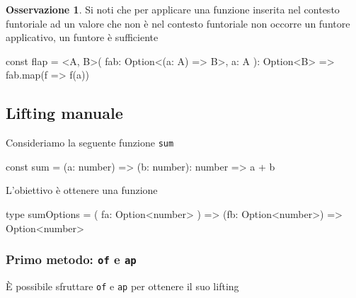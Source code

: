 \documentclass[12pt]{article}
\theoremstyle{definition}
\newtheorem{observation}{Osservazione}[section]
\newenvironment{code}
  {\vspace{0.5cm} \VerbatimEnvironment\begin{typescriptcode}}
  {\end{typescriptcode} \vspace{0.2cm}}
\begin{document}






\begin{observation}
Si noti che per applicare una funzione inserita nel contesto funtoriale ad un valore
che non è nel contesto funtoriale non occorre un funtore applicativo, un funtore è sufficiente
\end{observation}

\begin{code}
const flap = <A, B>(
  fab: Option<(a: A) => B>,
  a: A
): Option<B> => fab.map(f => f(a))
\end{code}

\subsection{Lifting manuale}

Consideriamo la seguente funzione \texttt{sum}

\begin{code}
const sum = (a: number) => (b: number): number => a + b
\end{code}

L'obiettivo è ottenere una funzione

\begin{code}
type sumOptions = (
  fa: Option<number>
) => (fb: Option<number>) => Option<number>
\end{code}

\subsubsection{Primo metodo: \texttt{of} e \texttt{ap}}

È possibile sfruttare \texttt{of} e \texttt{ap} per ottenere il suo lifting
\end{document}
